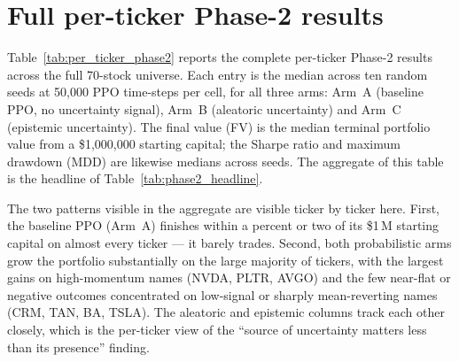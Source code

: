 \section{Full per-ticker Phase-2 results}
\label{app:full_per_ticker_phase2}

Table~\ref{tab:per_ticker_phase2} reports the complete per-ticker Phase-2 results across the full 70-stock universe. Each entry is the median across ten random seeds at 50,000 PPO time-steps per cell, for all three arms: Arm~A (baseline PPO, no uncertainty signal), Arm~B (aleatoric uncertainty) and Arm~C (epistemic uncertainty). The final value (FV) is the median terminal portfolio value from a \$1,000,000 starting capital; the Sharpe ratio and maximum drawdown (MDD) are likewise medians across seeds. The aggregate of this table is the headline of Table~\ref{tab:phase2_headline}.

The two patterns visible in the aggregate are visible ticker by ticker here. First, the baseline PPO (Arm~A) finishes within a percent or two of its \$1\,M starting capital on almost every ticker --- it barely trades. Second, both probabilistic arms grow the portfolio substantially on the large majority of tickers, with the largest gains on high-momentum names (NVDA, PLTR, AVGO) and the few near-flat or negative outcomes concentrated on low-signal or sharply mean-reverting names (CRM, TAN, BA, TSLA). The aleatoric and epistemic columns track each other closely, which is the per-ticker view of the ``source of uncertainty matters less than its presence'' finding.

